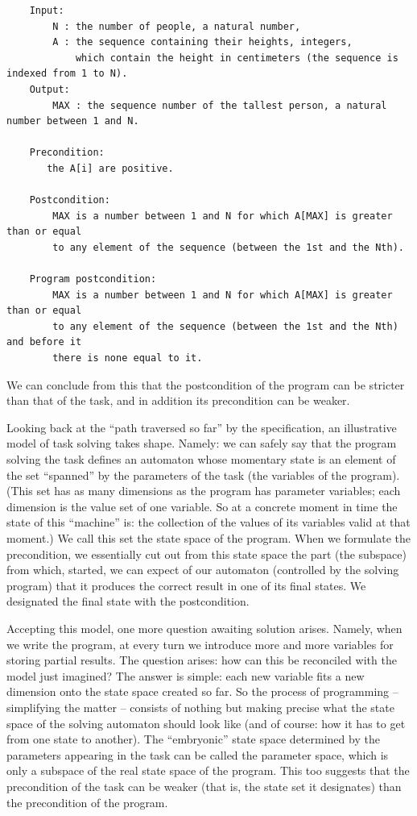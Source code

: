 \documentclass[margin=0px]{article}
\begin{document}
\begin{verbatim}
	Input:
    	N : the number of people, a natural number,
    	A : the sequence containing their heights, integers,
        	which contain the height in centimeters (the sequence is indexed from 1 to N).
	Output:
    	MAX : the sequence number of the tallest person, a natural number between 1 and N.

	Precondition:
	   the A[i] are positive.

   	Postcondition:
     	MAX is a number between 1 and N for which A[MAX] is greater than or equal
	    to any element of the sequence (between the 1st and the Nth).

	Program postcondition:
	   	MAX is a number between 1 and N for which A[MAX] is greater than or equal
	   	to any element of the sequence (between the 1st and the Nth) and before it
	   	there is none equal to it.
	\end{verbatim}

We can conclude from this that the postcondition of the program can be stricter than that of the task, and in addition its precondition can be weaker.

Looking back at the ``path traversed so far'' by the specification, an illustrative model of task solving takes shape. Namely: we can safely say that the program solving the task defines an automaton whose momentary state is an element of the set ``spanned'' by the parameters of the task (the variables of the program). (This set has as many dimensions as the program has parameter variables; each dimension is the value set of one variable. So at a concrete moment in time the state of this ``machine'' is: the collection of the values of its variables valid at that moment.) We call this set the state space of the program. When we formulate the precondition, we essentially cut out from this state space the part (the subspace) from which, started, we can expect of our automaton (controlled by the solving program) that it produces the correct result in one of its final states. We designated the final state with the postcondition.

Accepting this model, one more question awaiting solution arises. Namely, when we write the program, at every turn we introduce more and more variables for storing partial results. The question arises: how can this be reconciled with the model just imagined? The answer is simple: each new variable fits a new dimension onto the state space created so far. So the process of programming -- simplifying the matter -- consists of nothing but making precise what the state space of the solving automaton should look like (and of course: how it has to get from one state to another). The ``embryonic'' state space determined by the parameters appearing in the task can be called the parameter space, which is only a subspace of the real state space of the program. This too suggests that the precondition of the task can be weaker (that is, the state set it designates) than the precondition of the program.
\end{document}
